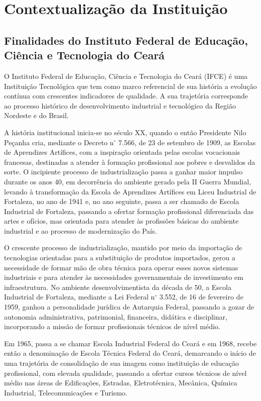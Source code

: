 \chapter{Contextualização da Instituição}

\section{Finalidades do Instituto Federal de Educação, Ciência e Tecnologia do Ceará}


O Instituto Federal de Educação, Ciência e Tecnologia do Ceará (IFCE) é uma Instituição Tecnológica que tem como marco referencial de sua história a evolução contínua com crescentes indicadores de qualidade. A sua trajetória corresponde ao processo histórico de desenvolvimento industrial e tecnológico da Região Nordeste e do Brasil.

A história institucional inicia-se no século XX, quando o então Presidente Nilo Peçanha cria, mediante o Decreto n$^\circ$  7.566, de 23 de setembro de 1909, as Escolas de Aprendizes Artífices, com a inspiração orientada pelas escolas vocacionais francesas, destinadas a atender à formação profissional aos pobres e desvalidos da sorte. O incipiente processo de industrialização passa a ganhar maior impulso durante os anos 40, em decorrência do ambiente gerado pela II Guerra Mundial, levando à transformação da Escola de Aprendizes Artífices em Liceu Industrial de Fortaleza, no ano de 1941 e, no ano seguinte, passa a ser chamado de Escola Industrial de Fortaleza, passando a ofertar formação profissional diferenciada das artes e ofícios, mas orientada para atender às profissões básicas do ambiente industrial e ao processo de modernização do País.

O crescente processo de industrialização, mantido por meio da importação de tecnologias orientadas para a substituição de produtos importados, gerou a necessidade de formar mão de obra técnica para operar esses novos sistemas industriais e para atender às necessidades governamentais de investimento em infraestrutura. No ambiente desenvolvimentista da década de 50, a Escola Industrial de Fortaleza, mediante a Lei Federal n$^\circ$ 3.552, de 16 de fevereiro de 1959, ganhou a personalidade jurídica de Autarquia Federal, passando a gozar de autonomia administrativa, patrimonial, financeira, didática e disciplinar, incorporando a missão de formar profissionais técnicos de nível médio.

Em 1965, passa a se chamar Escola Industrial Federal do Ceará e em 1968, recebe então a denominação de Escola Técnica Federal do Ceará, demarcando o início de uma trajetória de consolidação de sua imagem como instituição de educação profissional, com elevada qualidade, passando a ofertar cursos técnicos de nível médio nas áreas de Edificações, Estradas, Eletrotécnica, Mecânica, Química Industrial, Telecomunicações e Turismo.


